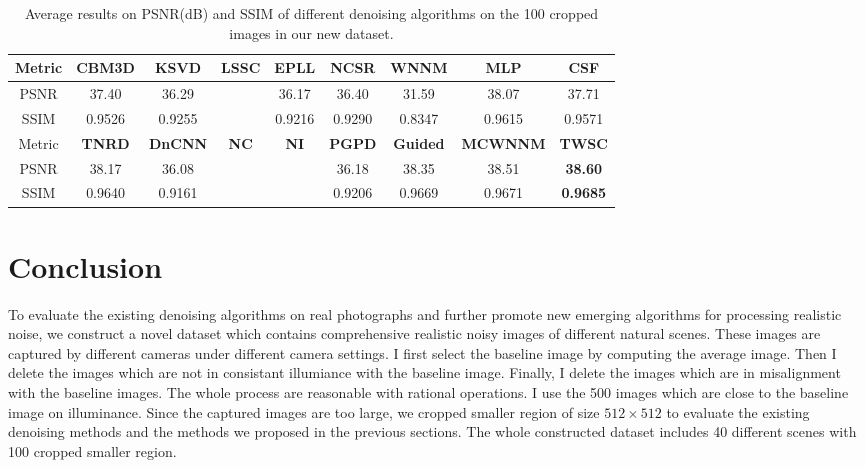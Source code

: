 \begin{table}[hbp]
\caption{Average results on PSNR(dB) and SSIM of different denoising algorithms on the 100 cropped images in our new dataset.}
\scriptsize
\label{tab6-1}
\begin{center}
\renewcommand\arraystretch{1.2}
\begin{tabular*}{1\textwidth}{@{\extracolsep{\fill}}ccccccccc}
\hline
Metric
&
\textbf{CBM3D}
&
\textbf{KSVD}
&
\textbf{LSSC}
&
\textbf{EPLL}
&
\textbf{NCSR}
&
\textbf{WNNM}
&
\textbf{MLP}
&
\textbf{CSF}
\\
\hline
PSNR & 37.40 & 36.29 &  & 36.17 & 36.40 & 31.59 & 38.07 & 37.71
\\
\hline
SSIM & 0.9526 & 0.9255 &  & 0.9216 & 0.9290 & 0.8347 & 0.9615 & 0.9571
\\
\hline
Metric
&
\textbf{TNRD}
&
\textbf{DnCNN}
&
\textbf{NC}
&
\textbf{NI}
&
\textbf{PGPD}
&
\textbf{Guided}
&
\textbf{MCWNNM}
&
\textbf{TWSC}
\\
\hline
PSNR & 38.17 & 36.08 &  &  & 36.18 & 38.35 & 38.51 & \textbf{38.60}
\\
\hline
SSIM & 0.9640 & 0.9161 &  &  & 0.9206 & 0.9669 & 0.9671 & \textbf{0.9685}
\\
\hline
\end{tabular*}
\end{center}
\end{table}




\section{Conclusion}

To evaluate the existing denoising algorithms on real photographs and further promote new emerging algorithms for processing realistic noise, we construct a novel dataset which contains comprehensive realistic noisy images of different natural scenes. These images are captured by different cameras under different camera settings. I first select the baseline image by computing the average image. Then I delete the images which are not in consistant illumiance with the baseline image. Finally, I delete the images which are in misalignment with the baseline images. The whole process are reasonable with rational operations. I use the 500 images which are close to the baseline image on illuminance. Since the captured images are too large, we cropped smaller region of size $512\times512$ to evaluate the existing denoising methods and the methods we proposed in the previous sections. The whole constructed dataset includes 40 different scenes with 100 cropped smaller region.

